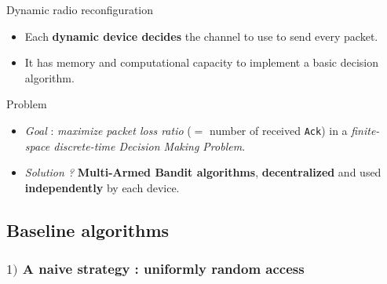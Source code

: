 \begin{frameO}[Hypotheses ($2/2$)]

    \begin{colorblock}{Dynamic radio reconfiguration}

        \begin{itemize}
            \item
                Each \textbf{dynamic device decides} the channel to use to send every packet.
            \item
                It has memory and computational capacity to implement a basic decision algorithm.
        \end{itemize}

    \end{colorblock}

    \vspace*{20pt}

    \begin{lightblock}{Problem}

        \begin{itemize}
            \item
                  \emph{Goal} : \emph{maximize packet loss ratio} (\(=\) number of
                  received \texttt{Ack}) in a \emph{finite-space discrete-time Decision
                      Making Problem}.
            \item
                  \emph{Solution ?} \textbf{Multi-Armed Bandit algorithms},
                  \textbf{decentralized} and used \textbf{independently} by each device.
        \end{itemize}

    \end{lightblock}

\end{frameO}



\subsection{Baseline algorithms}

\subsubsection{$1)$ A naive strategy : uniformly random access}

